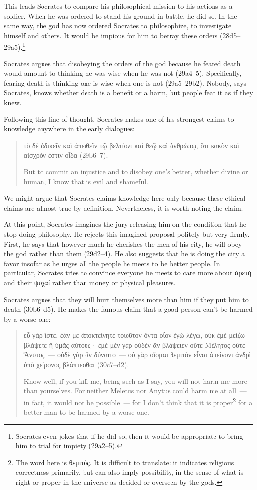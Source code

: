 \documentclass[11pt]{article}
\begin{document}
This leads Socrates to compare his philosophical mission to his actions as a soldier.  When he was ordered to stand his ground in battle, he did so.  In the same way, the god has now ordered Socrates to philosophize, to investigate himself and others.  It would be impious for him to betray these orders (28d5--29a5).\footnote{Socrates even jokes that if he did so, then it would be appropriate to bring him to trial for impiety (29a2--5).}

Socrates argues that disobeying the orders of the god because he feared death would amount to thinking he was wise when he was not (29a4--5).  Specifically, fearing death is thinking one is wise when one is not (29a5--29b2).  Nobody, says Socrates, knows whether death is a benefit or a harm, but people fear it as if they knew.

Following this line of thought, Socrates makes one of his strongest claims to knowledge anywhere in the early dialogues:

\begin{quote}
    τὸ δὲ ἀδικεῖν καὶ ἀπειθεῖν τῷ βελτίονι καὶ θεῷ καὶ ἀνθρώπῳ, ὅτι κακὸν καὶ αἰσχρόν ἐστιν οἶδα (29b6--7).

    But to commit an injustice and to disobey one's better, whether divine or human, I know that is evil and shameful.
\end{quote}

We might argue that Socrates claims knowledge here only because these ethical claims are almost true by definition.  Nevertheless, it is worth noting the claim.

At this point, Socrates imagines the jury releasing him on the condition that he stop doing philosophy.  He rejects this imagined proposal politely but very firmly.  First, he says that however much he cherishes the men of his city, he will obey the god rather than them (29d2--4).  He also suggests that he is doing the city a favor insofar as he urges all the people he meets to be better people.  In particular, Socrates tries to convince everyone he meets to care more about ἀρετή and their ψυχαί rather than money or physical pleasures.

Socrates argues that they will hurt themselves more than him if they put him to death (30b6--d5).  He makes the famous claim that a good person can't be harmed by a worse one:

\begin{quote}
    εὖ γὰρ ἴστε, ἐάν με ἀποκτείνητε τοιοῦτον ὄντα οἷον ἐγὼ λέγω, οὐκ ἐμὲ μείζω βλάψετε ἢ ὑμᾶς αὐτούς· ἐμὲ μὲν γὰρ οὐδὲν ἂν βλάψειεν οὔτε Μέλητος οὔτε Ἄνυτος~--- οὐδὲ γὰρ ἂν δύναιτο~--- οὐ γὰρ οἴομαι θεμιτὸν εἶναι ἀμείνονι ἀνδρὶ ὑπὸ χείρονος βλάπτεσθαι (30c7--d2).

    Know well, if you kill me, being such as I say, you will not harm me more than yourselves. For neither Meletus nor Anytus could harm me at all~--- in fact, it would not be possible~--- for I don't think that it is proper\footnote{The word here is θεμιτός.  It is difficult to translate: it indicates religious correctness primarily, but can also imply possibility, in the sense of what is right or proper in the universe as decided or overseen by the gods.} for a better man to be harmed by a worse one.
\end{quote}
\end{document}
